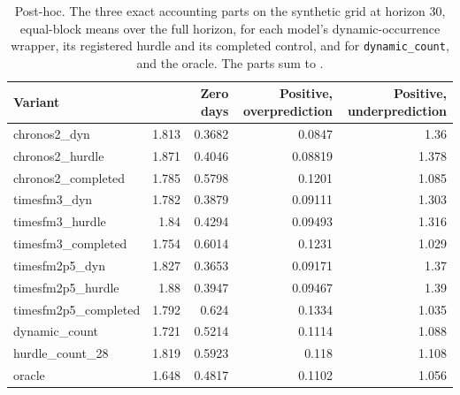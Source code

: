 \begin{table}[htbp]
\centering\small
\caption{Post-hoc. The three exact accounting parts on the synthetic grid at horizon 30, equal-block means
over the full horizon, for each model's dynamic-occurrence wrapper, its registered hurdle and its completed
control, and for \texttt{dynamic\_count}, \hc{} and the oracle. The parts sum to \qs{}.}
\label{tab:s2dynparts}
\begin{tabular}{lrrrr}
\toprule
Variant & \qs{} & Zero days & Positive, overprediction & Positive, underprediction \\
\midrule
chronos2\_dyn & 1.813 & 0.3682 & 0.0847 & 1.36 \\
chronos2\_hurdle & 1.871 & 0.4046 & 0.08819 & 1.378 \\
chronos2\_completed & 1.785 & 0.5798 & 0.1201 & 1.085 \\
timesfm3\_dyn & 1.782 & 0.3879 & 0.09111 & 1.303 \\
timesfm3\_hurdle & 1.84 & 0.4294 & 0.09493 & 1.316 \\
timesfm3\_completed & 1.754 & 0.6014 & 0.1231 & 1.029 \\
timesfm2p5\_dyn & 1.827 & 0.3653 & 0.09171 & 1.37 \\
timesfm2p5\_hurdle & 1.88 & 0.3947 & 0.09467 & 1.39 \\
timesfm2p5\_completed & 1.792 & 0.624 & 0.1334 & 1.035 \\
dynamic\_count & 1.721 & 0.5214 & 0.1114 & 1.088 \\
hurdle\_count\_28 & 1.819 & 0.5923 & 0.118 & 1.108 \\
oracle & 1.648 & 0.4817 & 0.1102 & 1.056 \\
\bottomrule
\end{tabular}
\end{table}

